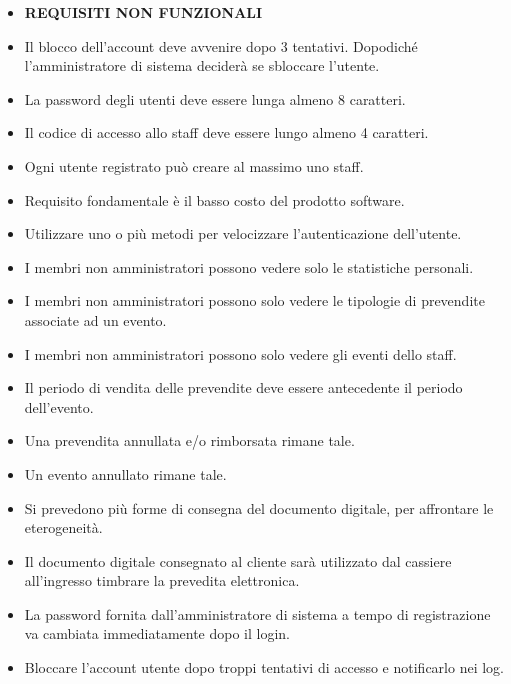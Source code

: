 \documentclass[a4paper]{article}
\begin{document}
\begin{itemize}
		
    \item \textbf{REQUISITI NON FUNZIONALI}
	
	\item Il blocco dell'account deve avvenire dopo 3 tentativi. Dopodiché l'amministratore di sistema deciderà se sbloccare l'utente.
	
	\item La password degli utenti deve essere lunga almeno 8 caratteri.
	\item Il codice di accesso allo staff deve essere lungo almeno 4 caratteri.
	\item Ogni utente registrato può creare al massimo uno staff.
	\item Requisito fondamentale è il basso costo del prodotto software.
	\item Utilizzare uno o più metodi per velocizzare l'autenticazione dell'utente.
	\item I membri non amministratori possono vedere solo le statistiche personali.	
	\item I membri non amministratori possono solo vedere le tipologie di prevendite associate ad un evento.
	\item I membri non amministratori possono solo vedere gli eventi dello staff.
	\item Il periodo di vendita delle prevendite deve essere antecedente il periodo dell'evento.
	\item Una prevendita annullata e/o rimborsata rimane tale.
	\item Un evento annullato rimane tale.
	\item Si prevedono più forme di consegna del documento digitale, per affrontare le eterogeneità.
	\item Il documento digitale consegnato al cliente sarà utilizzato dal cassiere all'ingresso timbrare la prevedita elettronica.
	\item La password fornita dall'amministratore di sistema a tempo di registrazione va cambiata immediatamente dopo il login.
	
	\item Bloccare l'account utente dopo troppi tentativi di accesso e notificarlo nei log.
	

\end{itemize}
\end{document}
